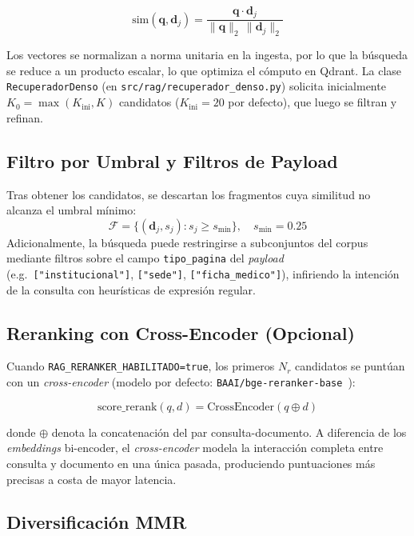 \documentclass[conference]{IEEEtran}
\newcommand{\code}[1]{\texttt{\small #1}}
\begin{document}
\begin{equation}
\mathrm{sim}(\mathbf{q}, \mathbf{d}_j)
= \frac{\mathbf{q} \cdot \mathbf{d}_j}{\|\mathbf{q}\|_2\,\|\mathbf{d}_j\|_2}
\label{eq:coseno}
\end{equation}

Los vectores se normalizan a norma unitaria en la ingesta, por lo que la
búsqueda se reduce a un producto escalar, lo que optimiza el cómputo en Qdrant.
La clase \code{RecuperadorDenso} (en \code{src/rag/recuperador\_denso.py})
solicita inicialmente $K_0 = \max(K_\text{ini}, K)$ candidatos
($K_\text{ini} = 20$ por defecto), que luego se filtran y refinan.

\subsection{Filtro por Umbral y Filtros de Payload}

Tras obtener los candidatos, se descartan los fragmentos cuya similitud no
alcanza el umbral mínimo:
\[
\mathcal{F} = \{(\mathbf{d}_j, s_j) : s_j \geq s_{\min}\}, \quad s_{\min} = 0.25
\]
Adicionalmente, la búsqueda puede restringirse a subconjuntos del corpus
mediante filtros sobre el campo \code{tipo\_pagina} del \textit{payload}
(e.g.\ \code{["institucional"]}, \code{["sede"]}, \code{["ficha\_medico"]}),
infiriendo la intención de la consulta con heurísticas de expresión regular.

\subsection{Reranking con Cross-Encoder (Opcional)}

Cuando \code{RAG\_RERANKER\_HABILITADO=true}, los primeros $N_r$ candidatos
se puntúan con un \textit{cross-encoder} (modelo por defecto:
\code{BAAI/bge-reranker-base}~\cite{bge2023}):

\begin{equation}
\text{score\_rerank}(q, d) = \mathrm{CrossEncoder}(q \oplus d)
\label{eq:rerank}
\end{equation}

donde $\oplus$ denota la concatenación del par consulta-documento. A diferencia
de los \textit{embeddings} bi-encoder, el \textit{cross-encoder} modela la
interacción completa entre consulta y documento en una única pasada, produciendo
puntuaciones más precisas a costa de mayor latencia.

\subsection{Diversificación MMR}
\end{document}
